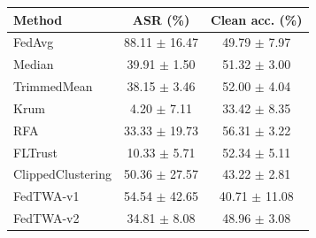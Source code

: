 \begin{tabular}{lcc}
\toprule
Method & ASR (\%) & Clean acc. (\%) \\
\midrule
FedAvg & 88.11 $\pm$ 16.47 & 49.79 $\pm$ 7.97 \\
Median & 39.91 $\pm$ 1.50 & 51.32 $\pm$ 3.00 \\
TrimmedMean & 38.15 $\pm$ 3.46 & 52.00 $\pm$ 4.04 \\
Krum & 4.20 $\pm$ 7.11 & 33.42 $\pm$ 8.35 \\
RFA & 33.33 $\pm$ 19.73 & 56.31 $\pm$ 3.22 \\
FLTrust & 10.33 $\pm$ 5.71 & 52.34 $\pm$ 5.11 \\
ClippedClustering & 50.36 $\pm$ 27.57 & 43.22 $\pm$ 2.81 \\
FedTWA-v1 & 54.54 $\pm$ 42.65 & 40.71 $\pm$ 11.08 \\
FedTWA-v2 & 34.81 $\pm$ 8.08 & 48.96 $\pm$ 3.08 \\
\bottomrule
\end{tabular}